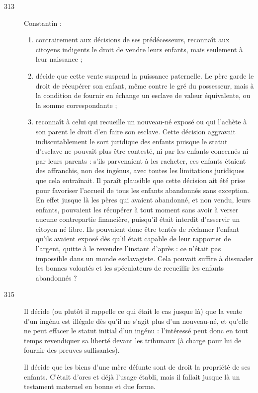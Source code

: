 \begin{description}
\item[313] Constantin :
 \begin{enumerate}[leftmargin=*,itemsep=0pt]
\item contrairement aux décisions de ses prédécesseurs, reconnaît aux citoyens indigents le droit de vendre leurs enfants, mais seulement à leur naissance ; 
\item décide que cette vente suspend la puissance paternelle. Le père garde le droit de récupérer son enfant, même contre le gré du possesseur, mais à la condition de fournir en échange un esclave de valeur équivalente, ou la somme correspondante ; 
\item reconnaît à celui qui recueille un nouveau-né exposé ou qui l'achète à son parent le droit d'en faire son esclave. Cette décision aggravait indiscutablement le sort juridique des enfants puisque le statut d'esclave ne pouvait plus être contesté, ni par les enfants concernés ni par leurs parents : s'ils parvenaient à les racheter, ces enfants étaient des affranchis, non des ingénus, avec toutes les limitations juridiques que cela entraînait. Il paraît plausible que cette décision ait été prise pour favoriser l'accueil de tous les enfants abandonnés sans exception. En effet jusque là les pères qui avaient abandonné, et non vendu, leurs enfants, pouvaient les récupérer à tout moment sans avoir à verser aucune contrepartie financière, puisqu'il était interdit d'asservir un citoyen né libre. Ils pouvaient donc être tentés de réclamer l'enfant qu'ils avaient exposé dès qu'il était capable de leur rapporter de l'argent, quitte à le revendre l'instant d'après : ce n'était pas impossible dans un monde esclavagiste. Cela pouvait suffire à dissuader les bonnes volontés et les spéculateurs de recueillir les enfants abandonnés ? 
\end{enumerate}
 
\item[315] Il décide (ou plutôt il rappelle ce qui était le cas jusque là) que la vente d'un ingénu est illégale dès qu'il ne s'agit plus d'un nouveau-né, et qu'elle ne peut effacer le statut initial d'un ingénu : l'intéressé peut donc en tout temps revendiquer sa liberté devant les tribunaux (à charge pour lui de fournir des preuves suffisantes).

Il décide que les biens d'une mère défunte sont de droit la propriété de ses enfants. C'était d'ores et déjà l'usage établi, mais il fallait jusque là un testament maternel en bonne et due forme.


\end{description}

